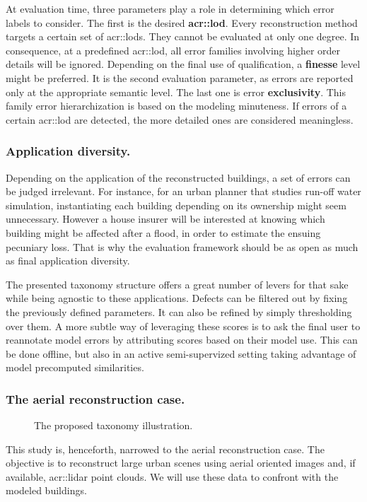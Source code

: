 \documentclass[runningheads]{llncs}
\begin{document}
At evaluation time, three parameters play a role in determining which error labels to consider. The first is the desired \textbf{\acrlong{acr::lod}}. Every reconstruction method targets a certain set of \glspl{acr::lod}. They cannot be evaluated at only one degree. In consequence, at a predefined \acrshort{acr::lod}, all error families involving higher order details will be ignored. Depending on the final use of qualification, a \textbf{finesse} level might be preferred. It is the second evaluation parameter, as errors are reported only at the appropriate semantic level. The last one is error \textbf{exclusivity}. This family error hierarchization is based on the modeling minuteness. If errors of a certain \acrshort{acr::lod} are detected, the more detailed ones are considered meaningless.

\subsubsection{Application diversity.}
Depending on the application of the reconstructed buildings, a set of errors can be judged irrelevant. For instance, for an urban planner that studies run-off water simulation, instantiating each building depending on its ownership might seem unnecessary. However a house insurer will be interested at knowing which building might be affected after a flood, in order to estimate the ensuing pecuniary loss. That is why the evaluation framework should be as open as much as final application diversity.

The presented taxonomy structure offers a great number of levers for that sake while being agnostic to these applications. Defects can be filtered out by fixing the previously defined parameters. It can also be refined by simply thresholding over them. A more subtle way of leveraging these scores is to ask the final user to reannotate model errors by attributing scores based on their model use. This can be done offline, but also in an active semi-supervized setting taking advantage of model precomputed similarities.

\subsubsection{The aerial reconstruction case.}
  \begin{figure}
        \begin{center}
            
            \caption{\label{fig::pipeline} The proposed taxonomy illustration. }
        \end{center}
    \end{figure}
This study is, henceforth, narrowed to the aerial reconstruction case. The objective is to reconstruct large urban scenes using aerial oriented images and, if available, \acrshort{acr::lidar} point clouds. We will use these data  to confront with the modeled buildings.
\end{document}
